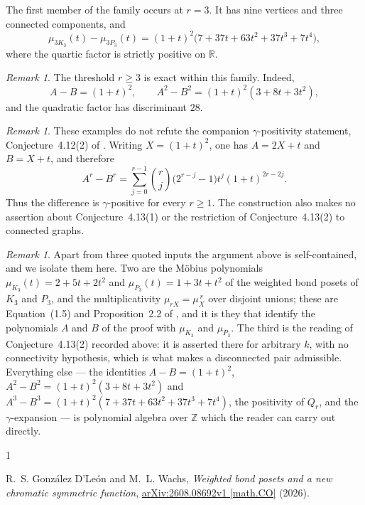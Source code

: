 \documentclass[11pt]{amsart}
\theoremstyle{remark}
\newtheorem{remark}[theorem]{Remark}
\begin{document}
The first member of the family occurs at $r=3$. It has nine vertices
and three connected components, and
\[
\mu_{3K_3}(t)-\mu_{3P_3}(t)
=(1+t)^2\bigl(7+37t+63t^2+37t^3+7t^4\bigr),
\]
where the quartic factor is strictly positive on $\mathbb{R}$.

\begin{remark}
The threshold $r\geq3$ is exact within this family. Indeed,
\[
A-B=(1+t)^2,
\qquad
A^2-B^2=(1+t)^2(3+8t+3t^2),
\]
and the quadratic factor has discriminant $28$.
\end{remark}

\begin{remark}
These examples do not refute the companion $\gamma$-positivity
statement, Conjecture~4.12(2) of \cite{GDLW}. Writing
$X=(1+t)^2$, one has $A=2X+t$ and $B=X+t$, and therefore
\[
A^r-B^r
=\sum_{j=0}^{r-1}
\binom{r}{j}\bigl(2^{r-j}-1\bigr)
t^j(1+t)^{2r-2j}.
\]
Thus the difference is $\gamma$-positive for every $r\geq1$.
The construction also makes no assertion about Conjecture~4.13(1)
or the restriction of Conjecture~4.13(2) to connected graphs.
\end{remark}

\begin{remark}
Apart from three quoted inputs the argument above is self-contained, and
we isolate them here. Two are the M\"obius polynomials
$\mu_{K_3}(t)=2+5t+2t^2$ and $\mu_{P_3}(t)=1+3t+t^2$ of the weighted
bond posets of $K_3$ and $P_3$, and the multiplicativity
$\mu_{rX}=\mu_X^{\,r}$ over disjoint unions; these are Equation~(1.5)
and Proposition~2.2 of \cite{GDLW}, and it is they that identify the
polynomials $A$ and $B$ of the proof with $\mu_{K_3}$ and $\mu_{P_3}$.
The third is the reading of Conjecture~4.13(2) recorded above: it is
asserted there for arbitrary $k$, with no connectivity hypothesis, which
is what makes a disconnected pair admissible. Everything else --- the
identities $A-B=(1+t)^2$, $A^2-B^2=(1+t)^2(3+8t+3t^2)$ and
$A^3-B^3=(1+t)^2(7+37t+63t^2+37t^3+7t^4)$, the positivity of $Q_r$, and
the $\gamma$-expansion --- is polynomial algebra over $\mathbb{Z}$ which
the reader can carry out directly.
\end{remark}

\begin{thebibliography}{1}

R.~S. Gonz\'alez D'Le\'on and M.~L. Wachs,
\emph{Weighted bond posets and a new chromatic symmetric function},
\href{https://arxiv.org/abs/2608.08692v1}
{arXiv:2608.08692v1 [math.CO]} (2026).

\end{thebibliography}
\end{document}
